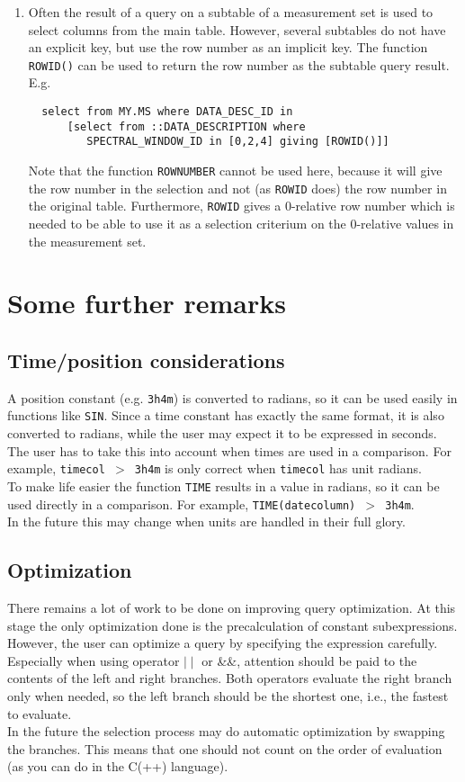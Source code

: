 \begin{enumerate}
\item
Often the result of a query on a subtable of a measurement set is
used to select columns from the main table. However, several
subtables do not have an explicit key, but use the row number as
an implicit key. The function \texttt{ROWID()} can be used to
return the row number as the subtable query result. E.g.
\begin{verbatim}
  select from MY.MS where DATA_DESC_ID in
      [select from ::DATA_DESCRIPTION where
         SPECTRAL_WINDOW_ID in [0,2,4] giving [ROWID()]] 
\end{verbatim}
Note that the function \texttt{ROWNUMBER} cannot be used here,
because it will give the row number in the selection and not
(as \texttt{ROWID} does) the row number in the original table.
Furthermore, \texttt{ROWID} gives a 0-relative row number which is
needed to be able to use it as a selection criterium on the 0-relative
values in the measurement set.
\end{enumerate}


\section{Some further remarks}
\subsection{Time/position considerations}
A position constant (e.g. \texttt{3h4m}) is converted to
radians, so it can be used easily in functions like \texttt{SIN}.
Since a time constant has exactly the same format, it is
also converted to radians, while the user may expect it to be
expressed in seconds. The user has to take this into account
when times are used in a comparison. For example, \texttt{timecol $>$ 3h4m}
is only correct when \texttt{timecol} has unit radians.
\\To make life easier the function \texttt{TIME} results in a value
in radians, so it can be used directly in a comparison. For example,
\texttt{TIME(datecolumn) $>$ 3h4m}.
\\In the future this may change when units are handled in their full glory.

\subsection{Optimization}
There remains a lot of work to be done on improving query optimization.
At this stage the only optimization done is the precalculation of constant
subexpressions.
\\
However, the user can optimize a query by specifying the expression
carefully. Especially when using operator $\mid\mid$ or \&\&,
attention should be
paid to the contents of the left and right branches. Both operators
evaluate the right branch only when needed, so the left branch
should be the shortest one, i.e., the fastest to evaluate.
\\In the future the selection process may do automatic optimization
by swapping the branches. This means that one should not count on
the order of evaluation (as you can do in the C(++) language).

